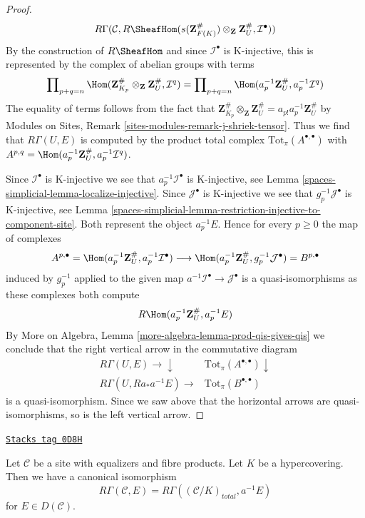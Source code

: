 \begin{proof}
$$
R\Gamma(\mathcal{C}, R\SheafHom(
s(\mathbf{Z}_{F(K)}^\#) \otimes_\mathbf{Z} \mathbf{Z}_U^\#,
\mathcal{I}^\bullet))
$$
By the construction of $R\SheafHom$ and since $\mathcal{I}^\bullet$
is K-injective, this is represented by the complex of abelian groups
with terms
$$
\prod\nolimits_{p + q = n}
\Hom(\mathbf{Z}^\#_{K_p} \otimes_\mathbf{Z} \mathbf{Z}_U^\#, \mathcal{I}^q)
=
\prod\nolimits_{p + q = n}
\Hom(a_p^{-1}\mathbf{Z}_U^\#, a_p^{-1}\mathcal{I}^q)
$$
The equality of terms follows from the fact that
$\mathbf{Z}^\#_{K_p} \otimes_\mathbf{Z} \mathbf{Z}_U^\# =
a_{p!}a_p^{-1}\mathbf{Z}_U^\#$ by Modules on Sites,
Remark \ref{sites-modules-remark-j-shriek-tensor}.
Thus we find that $R\Gamma(U, E)$ is computed by
the product total complex $\text{Tot}_\pi(A^{\bullet, \bullet})$
with $A^{p, q} = \Hom(a_p^{-1}\mathbf{Z}_U^\#, a_p^{-1}\mathcal{I}^q)$.

\medskip\noindent
Since $\mathcal{I}^\bullet$ is K-injective we see that
$a_p^{-1}\mathcal{I}^\bullet$ is K-injective, see
Lemma \ref{spaces-simplicial-lemma-localize-injective}.
Since $\mathcal{J}^\bullet$ is K-injective we see that
$g_p^{-1}\mathcal{J}^\bullet$ is K-injective, see
Lemma \ref{spaces-simplicial-lemma-restriction-injective-to-component-site}.
Both represent the object $a_p^{-1}E$.
Hence for every $p \geq 0$ the map of complexes
$$
A^{p, \bullet} = \Hom(a_p^{-1}\mathbf{Z}_U^\#, a_p^{-1}\mathcal{I}^\bullet)
\longrightarrow
\Hom(a_p^{-1}\mathbf{Z}_U^\#, g_p^{-1}\mathcal{J}^\bullet) = B^{p, \bullet}
$$
induced by $g_p^{-1}$ applied to the given map
$a^{-1}\mathcal{I}^\bullet \to \mathcal{J}^\bullet$
is a quasi-isomorphisms as these complexes both compute
$$
R\Hom(a_p^{-1}\mathbf{Z}_U^\#, a_p^{-1}E)
$$
By More on Algebra, Lemma \ref{more-algebra-lemma-prod-qis-gives-qis}
we conclude that the right vertical arrow in the commutative diagram
$$
\begin{array}{cc}R\Gamma(U, E) \longrightarrow\downarrow & \text{Tot}_\pi(A^{\bullet, \bullet}) \downarrow \\ R\Gamma(U, Ra_*a^{-1}E) \longrightarrow & \text{Tot}_\pi(B^{\bullet, \bullet})\end{array}
$$
is a quasi-isomorphism. Since we saw above that the horizontal arrows
are quasi-isomorphisms, so is the left vertical arrow.
\end{proof}

\begin{lemma}
\label{spaces-simplicial-lemma-compare-cohomology-hypercovering}
\href{https://stacks.math.columbia.edu/tag/0D8H}{\texttt{Stacks tag 0D8H}}

Let $\mathcal{C}$ be a site with equalizers and fibre products.
Let $K$ be a hypercovering.
Then we have a canonical isomorphism
$$
R\Gamma(\mathcal{C}, E) =
R\Gamma((\mathcal{C}/K)_{total}, a^{-1}E)
$$
for $E \in D(\mathcal{C})$.
\end{lemma}

